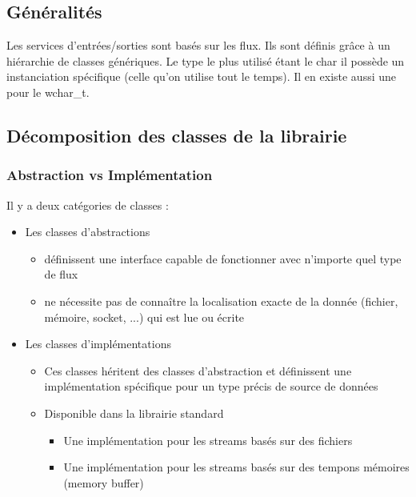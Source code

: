 \documentclass[10pt,a4paper,twoside]{article}
\begin{document}
\subsection{Généralités}
Les services d'entrées/sorties sont basés sur les flux. Ils sont définis grâce à un hiérarchie de classes génériques. Le type le plus utilisé étant le char il possède un instanciation spécifique (celle qu'on utilise tout le temps). Il en existe aussi une pour le wchar\_t.
\subsection{Décomposition des classes de la librairie}
\subsubsection{Abstraction vs Implémentation}
Il y a deux catégories de classes :
\begin{itemize}
\item Les classes d'abstractions
\begin{itemize}
\item définissent une interface capable de fonctionner avec n'importe quel type de flux
\item ne nécessite pas de connaître la localisation exacte de la donnée (fichier, mémoire, socket, ...) qui est lue ou écrite
\end{itemize}
\item Les classes d'implémentations
\begin{itemize}
\item Ces classes héritent des classes d'abstraction et définissent une implémentation spécifique pour un type précis de source de données
\item Disponible dans la librairie standard
\begin{itemize}
\item Une implémentation pour les streams basés sur des fichiers
\item Une implémentation pour les streams basés sur des tempons mémoires (memory buffer)
\end{itemize}
\end{itemize}
\end{itemize}
\end{document}
